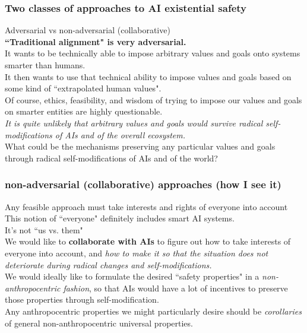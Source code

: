 \documentclass{beamer}
\begin{document}
\begin{frame}

  \frametitle{Two classes of approaches to AI existential safety}

Adversarial vs non-adversarial (collaborative)\\[2ex]

{\bf ``Traditional alignment" is very adversarial.}\\[2ex]

It wants to be technically able to impose arbitrary values and goals onto systems smarter than humans.\\[2ex]

It then wants to use that technical ability to impose values and goals based on some kind of
``extrapolated human values".\\[2ex]

Of course, ethics, feasibility, and wisdom of trying to impose our values and goals on smarter entities are highly questionable.\\[2ex]

{\em It is quite unlikely that arbitrary values and goals would survive
radical self-modifications of AIs and of the overall ecosystem.}\\[2ex]

What could be the mechanisms preserving any particular values and goals
through radical self-modifications of AIs and of the world?

\end{frame}

\begin{frame}

  \frametitle{non-adversarial (collaborative) approaches (how I see it)}

Any feasible approach must take interests and rights of everyone into account\\[2ex]

This notion of ``everyone" definitely includes smart AI systems.\\[2ex]

It's not ``us vs. them"\\[2ex]

We would like to {\bf collaborate with AIs} to figure out how to take interests of everyone
into account, and {\em how to make it so that the situation does not deteriorate
during radical changes and self-modifications.}\\[2ex]

We would ideally like to formulate the desired ``safety properties" in a {\em non-anthropocentric fashion},
so that AIs would have a lot of incentives to preserve those properties through self-modification.\\[2ex]

Any anthropocentric properties we might particularly desire should be
{\em corollaries} of general non-anthropocentric universal properties.

\end{frame}
\end{document}

